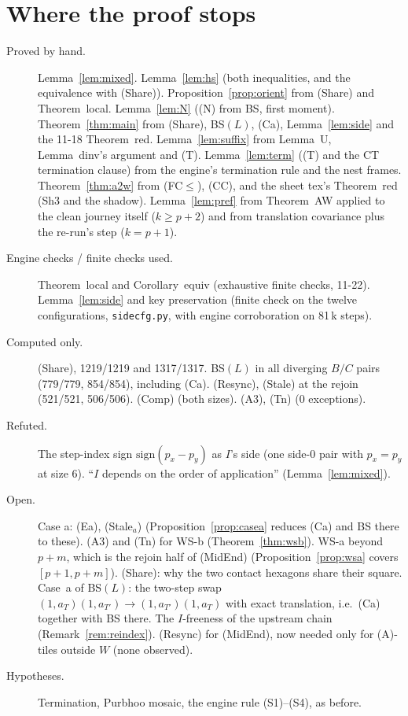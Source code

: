 \documentclass[11pt]{article}
\theoremstyle{definition}\newtheorem{definition}[theorem]{Definition}\newtheorem{remark}[theorem]{Remark}
\begin{document}
\section{Where the proof stops}\label{sec:gaps}
\begin{description}
\item[Proved by hand.] Lemma~\ref{lem:mixed}. Lemma~\ref{lem:hs} (both inequalities, and the equivalence with (Share)). Proposition~\ref{prop:orient} from (Share) and Theorem~local. Lemma~\ref{lem:N} ((N) from BS, first moment). Theorem~\ref{thm:main} from (Share), BS$(L)$, (Ca), Lemma~\ref{lem:side} and the 11-18 Theorem~red. Lemma~\ref{lem:suffix} from Lemma~U, Lemma~dinv's argument and (T). Lemma~\ref{lem:term} ((T) and the CT termination clause) from the engine's termination rule and the nest frames. Theorem~\ref{thm:a2w} from (FC$\le$), (CC), and the sheet tex's Theorem~red (Sh3 and the shadow). Lemma~\ref{lem:pref} from Theorem~AW applied to the clean journey itself ($k\ge p+2$) and from translation covariance plus the re-run's step ($k=p+1$).
\item[Engine checks / finite checks used.] Theorem~local and Corollary~equiv (exhaustive finite checks, 11-22). Lemma~\ref{lem:side} and key preservation (finite check on the twelve configurations, \texttt{sidecfg.py}, with engine corroboration on 81\,k steps).
\item[Computed only.] (Share), 1219/1219 and 1317/1317. BS$(L)$ in all diverging $B/C$ pairs (779/779, 854/854), including (Ca). (Resync), (Stale) at the rejoin (521/521, 506/506). (Comp) (both sizes). (A3), (Tn) (0 exceptions).
\item[Refuted.] The step-index sign $\mathrm{sign}(p_x-p_y)$ as $I$'s side (one side-0 pair with $p_x=p_y$ at size 6). ``$I$ depends on the order of application'' (Lemma~\ref{lem:mixed}).
\item[Open.] Case a: (Ea), (Stale$_a$) (Proposition~\ref{prop:casea} reduces (Ca) and BS there to these). (A3) and (Tn) for WS-b (Theorem~\ref{thm:wsb}). WS-a beyond $p+m$, which is the rejoin half of (MidEnd) (Proposition~\ref{prop:wsa} covers $[p+1,p+m]$). (Share): why the two contact hexagons share their square. Case~a of BS$(L)$: the two-step swap $(1,a_T)(1,a_{T'})\to(1,a_{T'})(1,a_T)$ with exact translation, i.e.\ (Ca) together with BS there. The $I$-freeness of the upstream chain (Remark~\ref{rem:reindex}). (Resync) for (MidEnd), now needed only for (A)-tiles outside $W$ (none observed).
\item[Hypotheses.] Termination, Purbhoo mosaic, the engine rule (S1)--(S4), as before.
\end{description}
\end{document}
